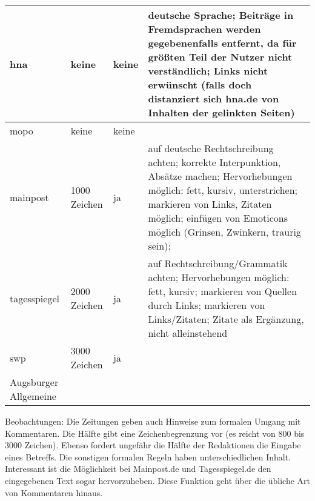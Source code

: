 \begin{landscape}
\begin{longtable}{l|llp{100mm}}
hna			& keine & keine & deutsche Sprache; Beiträge in Fremdsprachen werden gegebenenfalls entfernt, da für größten Teil der Nutzer nicht verständlich; Links nicht erwünscht (falls doch distanziert sich hna.de von Inhalten der gelinkten Seiten) \\\hline
mopo			& keine & keine & \\\hline
mainpost		& 1000 Zeichen & ja & auf deutsche Rechtschreibung achten; korrekte Interpunktion, Absätze machen; Hervorhebungen möglich: fett, kursiv, unterstrichen; markieren von Links, Zitaten möglich; einfügen von Emoticons möglich (Grinsen, Zwinkern, traurig sein); \\\hline
tagesspiegel		& 2000 Zeichen & ja & auf Rechtschreibung/Grammatik achten; Hervorhebungen möglich: fett, kursiv; markieren von Quellen durch Links; markieren von Links/Zitaten; Zitate als Ergänzung, nicht alleinstehend \\\hline
swp			& 3000 Zeichen & ja & \\ \hline
Augsburger Allgemeine	& & & \\ \hline

\end{longtable}
\end{landscape}

Beobachtungen:
Die Zeitungen geben auch Hinweise zum formalen Umgang mit Kommentaren. Die Hälfte gibt eine Zeichenbegrenzung vor (es reicht von 800 bis 3000 Zeichen). 
Ebenso fordert ungefähr die Hälfte der Redaktionen die Eingabe eines Betreffs. Die sonstigen formalen Regeln haben unterschiedlichen Inhalt. Interessant ist die Möglichkeit bei Mainpost.de und Tagesspiegel.de den eingegebenen Text sogar hervorzuheben. Diese Funktion geht über die übliche Art von Kommentaren hinaus. 

